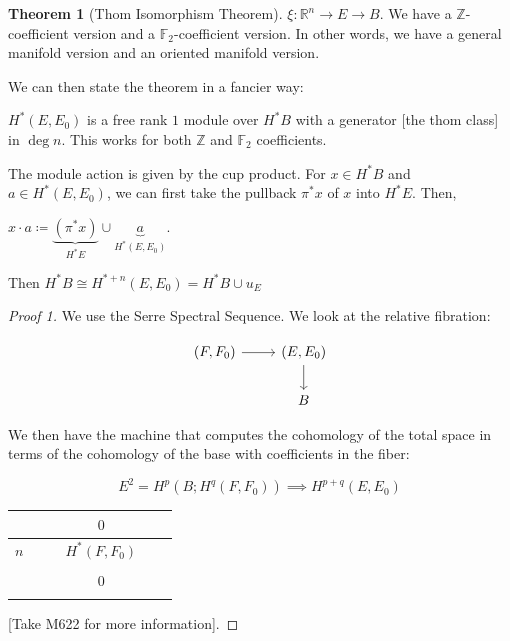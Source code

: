 \documentclass{article}
\theoremstyle{definition}
\newtheorem{theorem}{Theorem}
\begin{document}
    \begin{theorem}
        [Thom Isomorphism Theorem]

        \(\xi : \mathbb{R}^n \to E \to B\). We have a \(\mathbb{Z}\)-coefficient version and a \(\mathbb{F}_2\)-coefficient version. In other words, we have a general manifold version and an oriented manifold version.

        We can then state the theorem in a fancier way:

        \(H^{\ast} (E,E_0)\) is a free rank \(1\) module over \(H^{\ast} B\) with a generator [the thom class] in \(\deg n\). This works for both \(\mathbb{Z}\) and \(\mathbb{F}_2\) coefficients.

        The module action is given by the cup product. For \(x\in H^{\ast} B\) and \(a\in H^{\ast} (E, E_0)\), we can first take the pullback \(\pi ^{\ast} x\) of \(x\) into \(H^{\ast} E\). Then,

        \(x \cdot a \coloneqq \underbrace{(\pi ^{\ast} x)}_{H^{\ast} E} \cup \underbrace{a}_{H^{\ast} (E,E_0)}\).
        
        Then \(H^{\ast} B \cong H^{\ast + n} (E,E_0) = H^{\ast} B \cup u_E\) 
    \end{theorem}

    \begin{proof}
        [Proof 1]

        We use the Serre Spectral Sequence. We look at the relative fibration:

        \[
            \begin{tikzcd}
                (F,F_0) \ar[r] & (E,E_0) \ar[d] \\ & B
            \end{tikzcd}
        \]

        We then have the machine that computes the cohomology of the total space in terms of the cohomology of the base with coefficients in the fiber:

        \[
            E^2 = H^p(B;H^q(F,F_0)) \implies H^{p+q}(E,E_0)
        \]

        \begin{table}[H]
            \centering
            \begin{tabular}{c||ccccc}
                \toprule
                     &  &  & \(0\)  &  &  \\
                \midrule
                    \(n\)  &  &  & \(H^{\ast}(F,F_0)\)  &  &  \\
                \midrule
                     &  &  &  &  &  \\
                     &  &  & \(0\)  &  &  \\
                     &  &  &  &  &  \\
                \bottomrule
            \end{tabular}
        \end{table}

        [Take M622 for more information].
    \end{proof}
\end{document}
